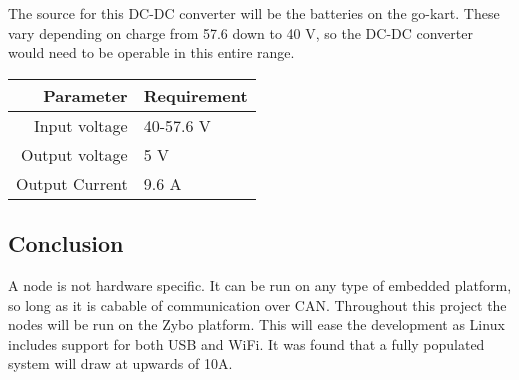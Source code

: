 The source for this DC-DC converter will be the batteries on the go-kart. 
These vary depending on charge from 57.6 down to 40 V, so the DC-DC converter would need to be operable in this entire range.


\begin{table}[H]
	\centering
	\begin{tabular}{r|l}
		Parameter & Requirement  \\
		\hline
		Input voltage & 40-57.6 V\\
		Output voltage & 5 V\\
		Output Current & 9.6 A
	\end{tabular}
\end{table}


\subsection{Conclusion}
A node is not hardware specific. 
It can be run on any type of embedded platform, so long as it is cabable of communication over CAN.
Throughout this project the nodes will be run on the Zybo platform.
This will ease the development as Linux includes support for both USB and WiFi.
It was found that a fully populated system will draw at upwards of 10\si{\ampere}.
